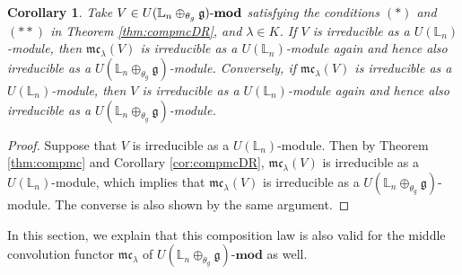\documentclass[a4paper,12pt]{article}
\newtheorem{cor}[thm]{Corollary}
\theoremstyle{definition}
\theoremstyle{remark}
\begin{document}
\begin{cor}\label{cor:irred}
	Take $V\in U(\mathbb{L}_{n}\oplus_{\theta_{g}}\mathfrak{g})\text{-}{\mathrm{\bf{mod}}}$
	satisfying the conditions $(*)$ and $(**)$ in Theorem \ref{thm:compmcDR},
	 and $\lambda\in K$.
	If $V$ is irreducible as a $U(\mathbb{L}_{n})$-module, then $\mathfrak{mc}_{\lambda}(V)$ is irreducible as a 
	$U(\mathbb{L}_{n})$-module again and hence also irreducible as a
	$U(\mathbb{L}_{n}\oplus_{\theta_{g}}\mathfrak{g})$-module.
	Conversely, if $\mathfrak{mc}_{\lambda}(V)$ is irreducible as a $U(\mathbb{L}_{n})$-module, 
	then $V$ is irreducible as a 
	$U(\mathbb{L}_{n})$-module again and hence also irreducible as a
	$U(\mathbb{L}_{n}\oplus_{\theta_{g}}\mathfrak{g})$-module.
\end{cor}
\begin{proof}
Suppose that $V$ is irreducible as a $U(\mathbb{L}_{n})$-module.
Then by Theorem \ref{thm:compmc} and Corollary \ref{cor:compmcDR}, 
$\mathfrak{mc}_{\lambda}(V)$ is irreducible as a $U(\mathbb{L}_{n})$-module, which implies that $\mathfrak{mc}_{\lambda}(V)$ is irreducible as a $U(\mathbb{L}_{n}\oplus_{\theta_{g}}\mathfrak{g})$-module. 
The converse is also shown by the same argument.
\end{proof}

In this section, 
we explain that this composition law is 
also valid for the middle convolution functor $\mathfrak{mc}_{\lambda}$ of $U(\mathbb{L}_{n}\oplus_{\theta_{g}}\mathfrak{g})\text{-}\mathbf{mod}$
as well.
\end{document}
